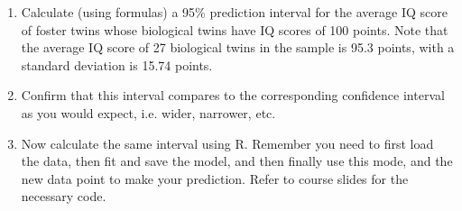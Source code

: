 \documentclass[11pt]{article}
\begin{document}
\begin{enumerate}

\item Calculate (using formulas) a 95\% prediction interval for the average IQ score of foster twins whose biological twins have IQ scores of 100 points. Note that the average IQ score of 27 biological twins in the sample is 95.3 points, with a standard deviation is 15.74 points. 


\item Confirm that this interval compares to the corresponding confidence interval as you would expect, i.e. wider, narrower, etc.

\item Now calculate the same interval using R. Remember you need to first load the data, then fit and save the model, and then finally use this mode, and the new data point to make your prediction. Refer to course slides for the necessary code.

%
%
%
%

\end{enumerate}

%
\end{document}
